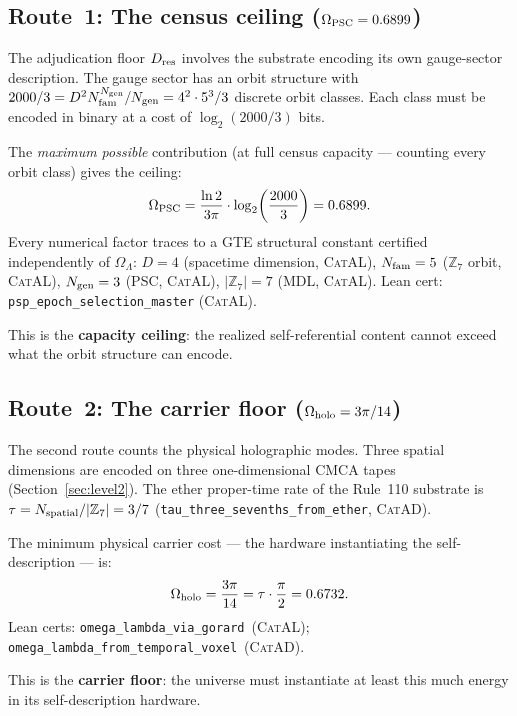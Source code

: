 \documentclass[11pt,a4paper]{article}
\newcommand{\lean}[1]{\texttt{#1}}
\newcommand{\OmL}{\Omega_\Lambda}
\newcommand{\Dres}{D_{\rm res}}
\newcommand{\ZS}{\mathbb{Z}_7}
\newcommand{\CatAL}{\textsc{CatAL}}
\newcommand{\CatAD}{\textsc{CatAD}}
\begin{document}
\subsection{Route~1: The census ceiling ($\Omega_{\rm PSC} = 0.6899$)}

The adjudication floor $\Dres$ involves the substrate encoding its own
gauge-sector description.  The gauge sector has an orbit structure with
$2000/3 = D^2 N_{\rm fam}^{N_{\rm gen}} / N_{\rm gen} = 4^2 \cdot 5^3 / 3$
discrete orbit classes.  Each class must be encoded in binary at a cost of
$\log_2(2000/3)$ bits.

The \emph{maximum possible} contribution (at full census capacity --- counting
every orbit class) gives the ceiling:
\begin{equation}
  \Omega_{\rm PSC}
  = \frac{\ln 2}{3\pi} \cdot \log_2\!\left(\frac{2000}{3}\right)
  = 0.6899.
\label{eq:psc}
\end{equation}
Every numerical factor traces to a GTE structural constant certified
independently of $\OmL$:
$D = 4$ (spacetime dimension, \CatAL),
$N_{\rm fam} = 5$ ($\ZS$ orbit, \CatAL),
$N_{\rm gen} = 3$ (PSC, \CatAL),
$|\ZS| = 7$ (MDL, \CatAL).
Lean cert: \lean{psp\_epoch\_selection\_master} (\CatAL).

This is the \textbf{capacity ceiling}: the realized self-referential content
cannot exceed what the orbit structure can encode.

\subsection{Route~2: The carrier floor ($\Omega_{\rm holo} = 3\pi/14$)}

The second route counts the physical holographic modes.  Three spatial
dimensions are encoded on three one-dimensional CMCA tapes (Section~\ref{sec:level2}).
The ether proper-time rate of the Rule~110 substrate is
$\tau = N_{\rm spatial}/|\ZS| = 3/7$
(\lean{tau\_three\_sevenths\_from\_ether}, \CatAD).

The minimum physical carrier cost --- the hardware instantiating the
self-description --- is:
\begin{equation}
  \Omega_{\rm holo}
  = \frac{3\pi}{14}
  = \tau \cdot \frac{\pi}{2}
  = 0.6732.
\label{eq:holo}
\end{equation}
{\small Lean certs: \lean{omega\_lambda\_via\_gorard}~(\CatAL);
\lean{omega\_lambda\_from\_temporal\_voxel}~(\CatAD).}

This is the \textbf{carrier floor}: the universe must instantiate at least this
much energy in its self-description hardware.
\end{document}

